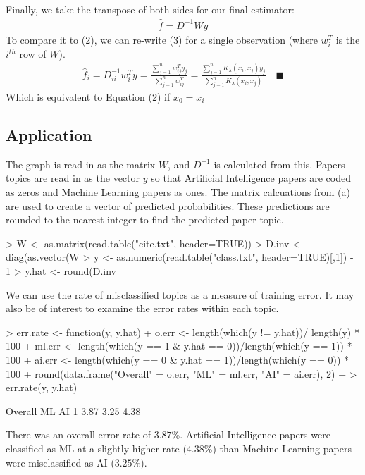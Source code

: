 \documentclass[a4paper]{article}
\begin{document}
Finally, we take the transpose of both sides for our final estimator:
\begin{align}
  \hat{f} = D^{-1}Wy
\end{align}
To compare it to (2), we can re-write (3) for a single observation (where $w_i^T$ is
the $i^{th}$ row of $W$).
\begin{align*}
  \hat{f}_i = D^{-1}_{ii} w_i^T y
    = \frac{\sum_{j=1}^n w_{ij}^Ty_j}{\sum_{j=1}^n w_{ij}^T}
    = \frac{\sum_{j=1}^n K_\lambda(x_i, x_j)y_j}
           {\sum_{j=1}^n K_\lambda(x_i, x_j)} \quad \blacksquare
\end{align*}
Which is equivalent to Equation (2) if $x_0 = x_i$
\subsection{Application}
The graph is read in as the matrix $W$, and $D^{-1}$ is calculated from this.
Papers topics are read in as the vector $y$ so that
Artificial Intelligence papers are coded as zeros and Machine Learning papers
as ones.  The matrix calcuations from (a) are used to create a vector of predicted
probabilities.  These predictions are rounded to the nearest integer to find the
predicted paper topic.
\begin{Schunk}
\begin{Sinput}
> W <- as.matrix(read.table("cite.txt", header=TRUE))
> D.inv <- diag(as.vector(W %*% rep(1, nrow(W)))^(-1))
> y <- as.numeric(read.table("class.txt", header=TRUE)[,1]) - 1
> y.hat <- round(D.inv %*% W %*% y)
\end{Sinput}
\end{Schunk}
We can use the rate of misclassified topics as a measure of training error. It may
also be of interest to examine the error rates within each topic.
\begin{Schunk}
\begin{Sinput}
> err.rate <- function(y, y.hat){
+     o.err <- length(which(y != y.hat))/ length(y) * 100
+     ml.err <- length(which(y == 1 & y.hat == 0))/length(which(y == 1)) * 100
+     ai.err <- length(which(y == 0 & y.hat == 1))/length(which(y == 0)) * 100
+     round(data.frame("Overall" = o.err, "ML" = ml.err, "AI" = ai.err), 2)
+ }
> err.rate(y, y.hat)
\end{Sinput}
\begin{Soutput}
  Overall   ML   AI
1    3.87 3.25 4.38
\end{Soutput}
\end{Schunk}
There was an overall error rate of $3.87$\%.  Artificial Intelligence papers
were classified as ML at a slightly higher rate ($4.38$\%) than Machine Learning papers
were misclassified as AI ($3.25$\%).\\
\end{document}
